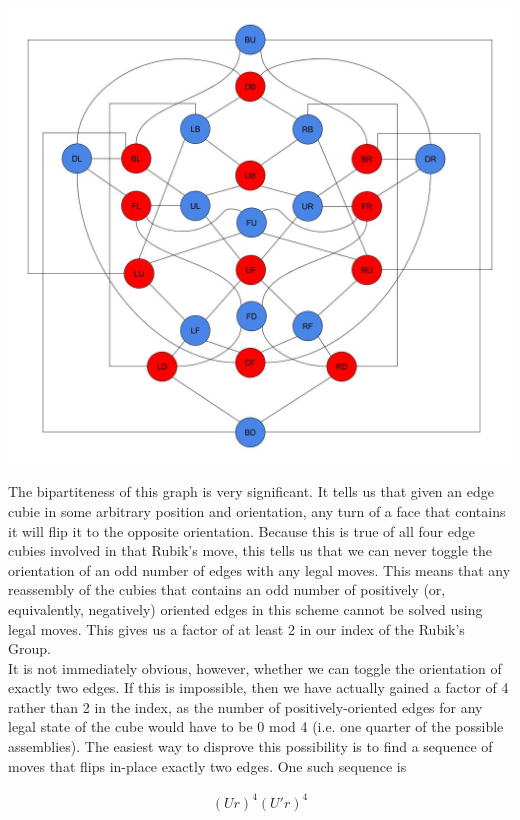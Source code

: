 \documentclass[10pt,letterpaper]{report}
\begin{document}
\begin{center}
\includegraphics[scale=.35]{images/Rubiks_Edge_Graph.jpg} 
\end{center}

The bipartiteness of this graph is very significant.  It tells us that given an edge cubie in some arbitrary position and orientation, any turn of a face that contains it will flip it to the opposite orientation.  Because this is true of all four edge cubies involved in that Rubik's move, this tells us that we can never toggle the orientation of an odd number of edges with any legal moves.  This means that any reassembly of the cubies that contains an odd number of positively (or, equivalently, negatively) oriented edges in this scheme cannot be solved using legal moves.  This gives us a factor of at least 2 in our index of the Rubik's Group. \\

It is not immediately obvious, however, whether we can toggle the orientation of exactly two edges.  If this is impossible, then we have actually gained a factor of 4 rather than 2 in the index, as the number of positively-oriented edges for any legal state of the cube would have to be 0 mod 4 (i.e. one quarter of the possible assemblies).  The easiest way to disprove this possibility is to find a sequence of moves that flips in-place exactly two edges.  One such sequence is

\begin{align*}
(Ur)^4(U'r)^4
\end{align*}
\end{document}
